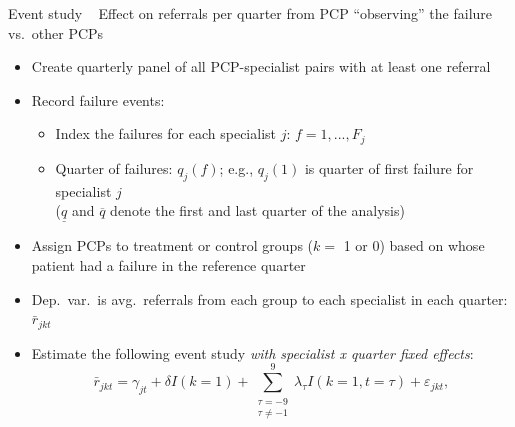 \documentclass[slides, aspectratio=169]{beamer}
\newcommand{\bit}{\begin{itemize}}
\newcommand{\eit}{\end{itemize}}
\begin{document}
\begin{frame}[t]{Event study \ \hyperlink{es-general}{}}
{Effect on referrals per quarter from PCP ``observing'' the failure vs.~other PCPs}
\label{eventstudy}
\begin{itemize}

    \item Create quarterly panel of all PCP-specialist pairs with at least one referral
    \smallskip
    \item Record failure events:
    \bit
        \item Index the failures for each specialist $j$: $f=1,...,F_{j}$
        \item Quarter of failures: $q_{j}(f)$; e.g., $q_{j}(1)$ is quarter of first failure for specialist $j$ \\
        ($\underline{q}$ and $\overline{q}$ denote the first and last quarter of the analysis)
    \eit
    \smallskip
    \item Assign PCPs to treatment or control groups ($k = $ 1 or 0) based on whose patient had a failure in the reference quarter
    \smallskip
    \item Dep.~var.~is avg.~referrals from each group to each specialist in each quarter: $\bar{r}_{jkt}$
    \smallskip
    \item Estimate the following event study \emph{with specialist x quarter fixed effects}:
    \vskip-6pt
\begin{equation*}
  \bar{r}_{jkt} = \gamma_{jt} + \delta I(k=1) + \sum_{\substack{\tau=-9 \\ \tau \neq -1}}^{9} \lambda_{\tau} I(k=1, t=\tau) + \varepsilon_{jkt},
\end{equation*}

\end{itemize}
\end{frame}

\end{document}
